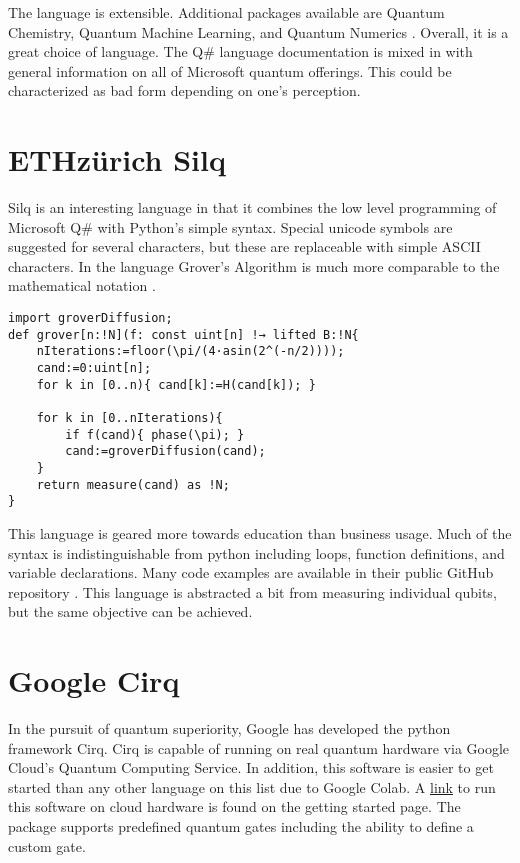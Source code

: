 \documentclass[conference]{IEEEtran}
\begin{document}
The language is extensible. Additional packages available are Quantum Chemistry, Quantum Machine Learning, and Quantum Numerics \cite{b6}. 
Overall, it is a great choice of language. 
The Q\# language documentation is mixed in with general information on all of Microsoft quantum offerings. 
This could be characterized as bad form depending on one's perception.



\section{ETHzürich Silq}
Silq is an interesting language in that it combines the low level programming of Microsoft Q\# with Python's simple syntax. 
Special unicode symbols are suggested for several characters, but these are replaceable with simple ASCII characters. 
In the language Grover's Algorithm is much more comparable to the mathematical notation \cite{b8}.
\begin{verbatim}
import groverDiffusion;
def grover[n:!N](f: const uint[n] !→ lifted B:!N{
	nIterations:=floor(\pi/(4·asin(2^(-n/2))));
	cand:=0:uint[n];
    for k in [0..n){ cand[k]:=H(cand[k]); }
    
	for k in [0..nIterations){
		if f(cand){ phase(\pi); }
		cand:=groverDiffusion(cand);
	}
	return measure(cand) as !N;
}
\end{verbatim}
This language is geared more towards education than business usage. 
Much of the syntax is indistinguishable from python including loops, function definitions, and variable declarations. 
Many code examples are available in their public GitHub repository \cite{b9}. 
This language is abstracted a bit from measuring individual qubits, but the same objective can be achieved. 



\section{Google Cirq}
In the pursuit of quantum superiority, Google has developed the python framework Cirq. 
Cirq is capable of running on real quantum hardware via Google Cloud's Quantum Computing Service. 
In addition, this software is easier to get started than any other language on this list due to Google Colab. 
A \href{https://colab.research.google.com/github/quantumlib/Cirq/blob/master/docs/start/start.ipynb}{link} to run this software on cloud hardware is found on the getting started page. 
The package supports predefined quantum gates including the ability to define a custom gate. 
\end{document}
